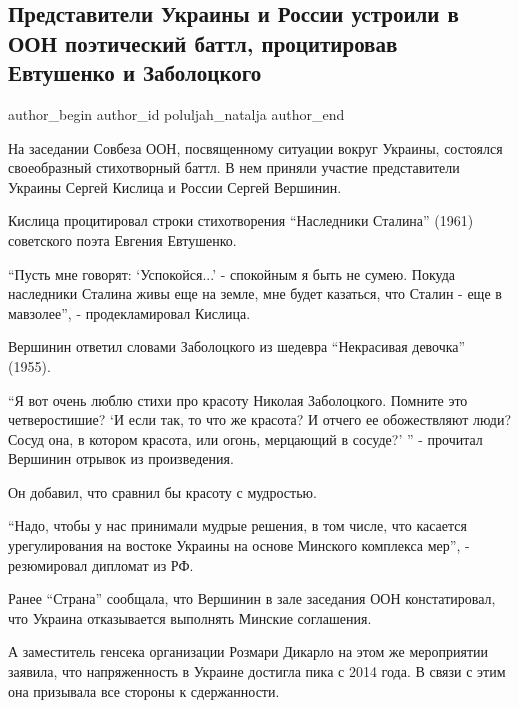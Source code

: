  
 
 
 
 
 
\subsection{Представители Украины и России устроили в ООН поэтический баттл, процитировав Евтушенко и Заболоцкого}
\label{sec:17_02_2022.stz.news.ua.strana.2.oon_battl_poezia_ukraina_rossia}
 
\ifcmt
 author_begin
   author_id poluljah_natalja
 author_end
\fi


На заседании Совбеза ООН, посвященному ситуации вокруг Украины, состоялся
своеобразный стихотворный баттл. В нем приняли участие представители Украины
Сергей Кислица и России Сергей Вершинин.

Кислица процитировал строки стихотворения \enquote{Наследники Сталина} (1961)
советского поэта Евгения Евтушенко.

\enquote{Пусть мне говорят: \enquote{Успокойся...} - спокойным я быть не сумею.
Покуда наследники Сталина живы еще на земле, мне будет казаться, что Сталин -
еще в мавзолее}, - продекламировал Кислица.

Вершинин ответил словами Заболоцкого из шедевра \enquote{Некрасивая девочка} (1955).

\enquote{Я вот очень люблю стихи про красоту Николая Заболоцкого. Помните это
четверостишие? \enquote{И если так, то что же красота? И отчего ее обожествляют
люди?  Сосуд она, в котором красота, или огонь, мерцающий в сосуде?} } -
прочитал Вершинин отрывок из произведения.

Он добавил, что сравнил бы красоту с мудростью.

\enquote{Надо, чтобы у нас принимали мудрые решения, в том числе, что касается
урегулирования на востоке Украины на основе Минского комплекса мер}, -
резюмировал дипломат из РФ.

Ранее \enquote{Страна} сообщала, что Вершинин в зале заседания ООН констатировал, что
Украина отказывается выполнять Минские соглашения.

А заместитель генсека организации Розмари Дикарло на этом же мероприятии
заявила, что напряженность в Украине достигла пика с 2014 года. В связи с этим
она призывала все стороны к сдержанности.
